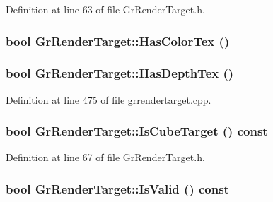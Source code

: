 \begin{CompactItemize}
Definition at line 63 of file GrRenderTarget.h.\hypertarget{class_gr_render_target_6466a4d09cef08dd33189714e271b53d}{
\subsubsection[{HasColorTex}]{\setlength{\rightskip}{0pt plus 5cm}bool GrRenderTarget::HasColorTex ()}}
\label{class_gr_render_target_6466a4d09cef08dd33189714e271b53d}


\hypertarget{class_gr_render_target_7948316d0f8d2a1712f6e031ef1a4d59}{
\subsubsection[{HasDepthTex}]{\setlength{\rightskip}{0pt plus 5cm}bool GrRenderTarget::HasDepthTex ()}}
\label{class_gr_render_target_7948316d0f8d2a1712f6e031ef1a4d59}




Definition at line 475 of file grrendertarget.cpp.\hypertarget{class_gr_render_target_63695c51fb0c525236ec9a749610f181}{
\subsubsection[{IsCubeTarget}]{\setlength{\rightskip}{0pt plus 5cm}bool GrRenderTarget::IsCubeTarget () const}}
\label{class_gr_render_target_63695c51fb0c525236ec9a749610f181}




Definition at line 67 of file GrRenderTarget.h.\hypertarget{class_gr_render_target_1cc14b5ad9acc58a67d462844e8d65bc}{
\subsubsection[{IsValid}]{\setlength{\rightskip}{0pt plus 5cm}bool GrRenderTarget::IsValid () const}}
\label{class_gr_render_target_1cc14b5ad9acc58a67d462844e8d65bc}





\end{CompactItemize}
